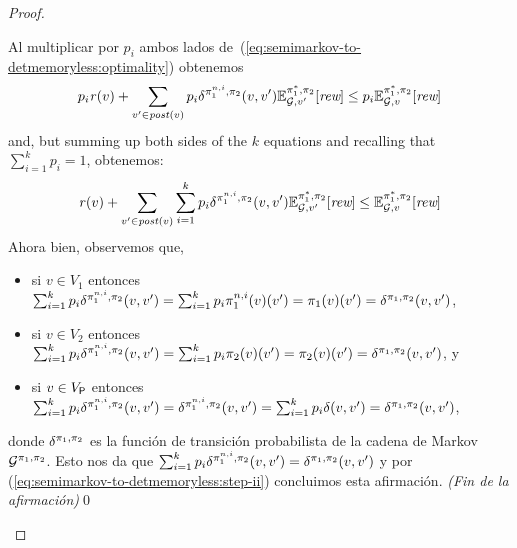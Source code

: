 \begin{proof}
\begin{proofofclaim}
    Al multiplicar por $p_i$ ambos lados de~(\ref{eq:semimarkov-to-detmemoryless:optimality}) obtenemos
    \begin{equation*}\label{eq:semimarkov-to-detmemoryless:step-i}
      p_i \mathit{r}(v) + \sum_{v' \in \mathit{post}(v)} p_i \delta^{\pi_{1}^{n,i},\pi_{2}}(v, v') \mathbb{E}^{\pi^*_{1}, \pi_{2}}_{\mathcal{G},v'}[\textit{rew}] \leq p_i \mathbb{E}^{\pi^*_{1}, \pi_{2}}_{\mathcal{G},v}[\textit{rew}]
    \end{equation*}
    and, but summing up both sides of the $k$ equations and recalling that
    $\sum_{i=1}^kp_i =1$, obtenemos:
    \begin{equation}\label{eq:semimarkov-to-detmemoryless:step-ii}
      \mathit{r}(v) + \sum_{v' \in \mathit{post}(v)}\sum_{i=1}^k p_i \delta^{\pi_{1}^{n,i},\pi_{2}}(v, v') \mathbb{E}^{\pi^*_{1}, \pi_{2}}_{\mathcal{G},v'}[\textit{rew}] \leq \mathbb{E}^{\pi^*_{1}, \pi_{2}}_{\mathcal{G},v}[\textit{rew}]
    \end{equation}
    Ahora bien, observemos que,
    \begin{itemize}
    \item%
    si $v\in V_1$ entonces
    $\sum_{i=1}^k p_i \delta^{\pi_{1}^{n,i},\pi_{2}}(v, v') = \sum_{i=1}^k p_i \pi_{1}^{n,i}(v)(v') = \pi_{1}(v)(v') = \delta^{\pi_{1},\pi_{2}}(v, v')$,
    \item%
    si $v\in V_2$ entonces
    $\sum_{i=1}^k p_i \delta^{\pi_{1}^{n,i},\pi_{2}}(v, v') = \sum_{i=1}^k p_i \pi_{2}(v)(v') = \pi_{2}(v)(v') = \delta^{\pi_{1},\pi_{2}}(v, v')$, y 
    \item%
    si $v\in V_{\mathsf{P}}$ entonces
    $\sum_{i=1}^k p_i \delta^{\pi_{1}^{n,i},\pi_{2}}(v, v') = \delta^{\pi_{1}^{n,i},\pi_{2}}(v, v') = \sum_{i=1}^k p_i \delta(v,v') = \delta^{\pi_{1},\pi_{2}}(v, v')$,
    \end{itemize}
    donde $\delta^{\pi_{1},\pi_{2}}$ es la función de transición probabilista de la cadena de Markov $\mathcal{G}^{\pi_{1},\pi_{2}}$.
    Esto nos da que
    $\sum_{i=1}^k p_i \delta^{\pi_{1}^{n,i},\pi_{2}}(v, v') = \delta^{\pi_{1},\pi_{2}}(v, v')$
    y por (\ref{eq:semimarkov-to-detmemoryless:step-ii}) concluimos esta afirmación.
    \hfill\emph{(Fin de la afirmación)}\qed
  \end{proofofclaim}


\end{proof}
